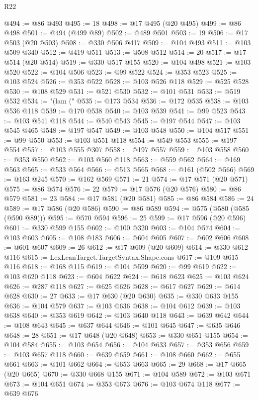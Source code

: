 \begin{lexlean}{R22}
\begin{coremodule}
@494 := @86 @493
@495 := 18
@498 := @17 @495 (@20 @495)
@499 := @86 @498
@501 := @494 (@499 @89)
@502 := @489 @501
@503 := 19
@506 := @17 @503 (@20 @503)
@508 := @330 @506 @417
@509 := @104 @493
@511 := @103 @509 @340
@512 := @419 @511
@513 := @508 @512
@514 := 20
@517 := @17 @514 (@20 @514)
@519 := @330 @517 @155
@520 := @104 @498
@521 := @103 @520
@522 := @104 @506
@523 := @99 @522
@524 := @353 @523
@525 := @103 @524
@526 := @353 @522
@528 := @103 @526 @118
@529 := @525 @528
@530 := @108 @529
@531 := @521 @530
@532 := @101 @531
@533 := @519 @532
@534 := "(lam ("
@535 := @173 @534
@536 := @172 @535
@538 := @103 @536 @118
@539 := @170 @538
@540 := @103 @539
@541 := @99 @523
@543 := @103 @541 @118
@544 := @540 @543
@545 := @197 @544
@547 := @103 @545 @465
@548 := @197 @547
@549 := @103 @548
@550 := @104 @517
@551 := @99 @550
@553 := @103 @551 @118
@554 := @549 @553
@555 := @197 @554
@557 := @103 @555 @307
@558 := @197 @557
@559 := @103 @558
@560 := @353 @550
@562 := @103 @560 @118
@563 := @559 @562
@564 := @169 @563
@565 := @533 @564
@566 := @513 @565
@568 := @161 (@502 @566)
@569 := @163 @245
@570 := @162 @569
@571 := 21
@574 := @17 @571 (@20 @571)
@575 := @86 @574
@576 := 22
@579 := @17 @576 (@20 @576)
@580 := @86 @579
@581 := 23
@584 := @17 @581 (@20 @581)
@585 := @86 @584
@586 := 24
@589 := @17 @586 (@20 @586)
@590 := @86 @589
@594 := @575 (@580 (@585 (@590 @89)))
@595 := @570 @594
@596 := 25
@599 := @17 @596 (@20 @596)
@601 := @330 @599 @155
@602 := @100 @320
@603 := @104 @574
@604 := @103 @603
@605 := @108 @183
@606 := @604 @605
@607 := @602 @606
@608 := @601 @607
@609 := 26
@612 := @17 @609 (@20 @609)
@614 := @330 @612 @116
@615 := LexLeanTarget.TargetSyntax.Shape.cons
@617 := @109 @615 @116
@618 := @168 @115
@619 := @104 @599
@620 := @99 @619
@622 := @103 @620 @118
@623 := @604 @622
@624 := @618 @623
@625 := @103 @624
@626 := @287 @118
@627 := @625 @626
@628 := @617 @627
@629 := @614 @628
@630 := 27
@633 := @17 @630 (@20 @630)
@635 := @330 @633 @155
@636 := @104 @579
@637 := @103 @636
@638 := @104 @612
@639 := @103 @638
@640 := @353 @619
@642 := @103 @640 @118
@643 := @639 @642
@644 := @108 @643
@645 := @637 @644
@646 := @101 @645
@647 := @635 @646
@648 := 28
@651 := @17 @648 (@20 @648)
@653 := @330 @651 @155
@654 := @104 @584
@655 := @103 @654
@656 := @104 @633
@657 := @353 @656
@659 := @103 @657 @118
@660 := @639 @659
@661 := @108 @660
@662 := @655 @661
@663 := @101 @662
@664 := @653 @663
@665 := 29
@668 := @17 @665 (@20 @665)
@670 := @330 @668 @155
@671 := @104 @589
@672 := @103 @671
@673 := @104 @651
@674 := @353 @673
@676 := @103 @674 @118
@677 := @639 @676

\end{coremodule}
\end{lexlean}

